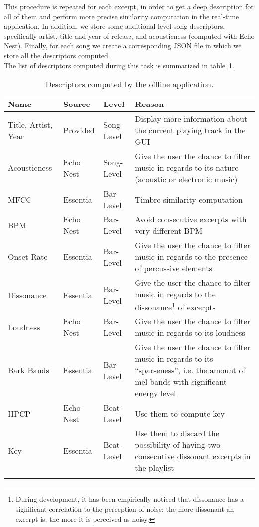 This procedure is repeated for each excerpt, in order to get a deep description for all of them and perform more precise similarity computation in the real-time application. In addition, we store some additional level-song descriptors, specifically artist, title and year of release, and acousticness (computed with Echo Nest). Finally, for each song we create a corresponding JSON file in which we store all the descriptors computed. \\
The list of descriptors computed during this task is summarized in table~\ref{table:offlinedescriptors}.

\newpage
\begin{center}
\begin{longtable}{| p{} | p{} | p{} | p{} |} 
\hline
\textbf{Name} & \textbf{Source} & \textbf{Level} & \textbf{Reason} \\ \hline
Title, Artist, Year & Provided & Song-Level & Display more information about the current playing track in the GUI \\ \hline
Acousticness & Echo Nest & Song-Level & Give the user the chance to filter music in regards to its nature (acoustic or electronic music) \\ \hline
MFCC & Essentia & Bar-Level & Timbre similarity computation \\ \hline
BPM & Echo Nest & Bar-Level & Avoid consecutive excerpts with very different BPM \\ \hline
Onset Rate & Essentia & Bar-Level & Give the user the chance to filter music in regards to the presence of percussive elements \\ \hline
Dissonance & Essentia & Bar-Level & Give the user the chance to filter music in regards to the dissonance\footnote{During development, it has been empirically noticed that dissonance has a significant correlation to the perception of noise: the more dissonant an excerpt is, the more it is perceived as noisy.} of excerpts \\ \hline
Loudness & Echo Nest & Bar-Level & Give the user the chance to filter music in regards to its loudness \\ \hline
Bark Bands & Essentia & Bar-Level & Give the user the chance to filter music in regards to its ``sparseness'', i.e. the amount of mel bands with significant energy level \\ \hline
HPCP & Echo Nest & Beat-Level & Use them to compute key \\ \hline
Key & Essentia & Beat-Level & Use them to discard the possibility of having two consecutive dissonant excerpts in the playlist \\ \hline
\caption[List of descriptors computed offline]{Descriptors computed by the offline application.}
\label{table:offlinedescriptors}
\end{longtable}
\end{center}


